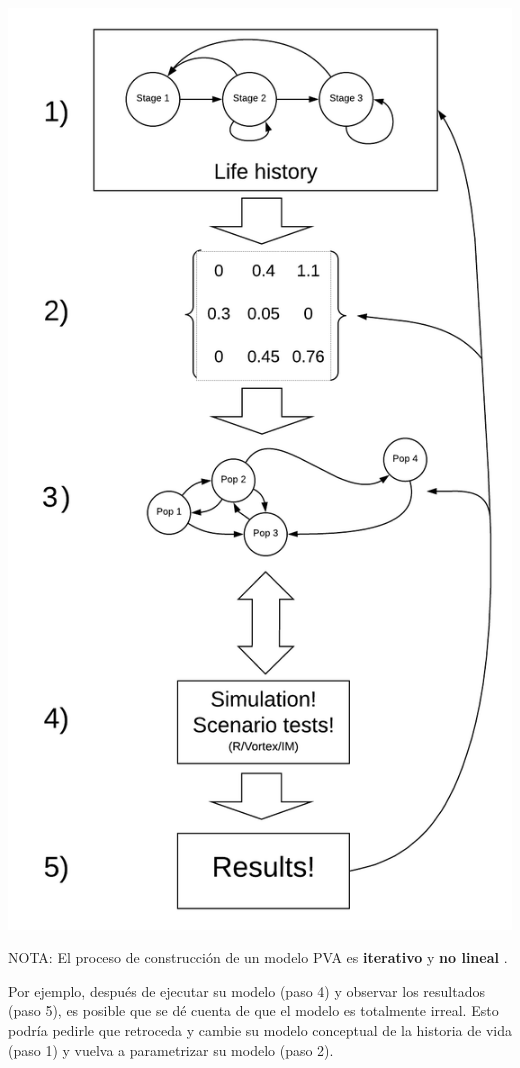\documentclass[
]{article}
\begin{document}
\includegraphics{figures/PVAschematic1.png}

NOTA: El proceso de construcción de un modelo PVA es \textbf{iterativo }
y \textbf{no lineal }.

Por ejemplo, después de ejecutar su modelo (paso 4) y observar los
resultados (paso 5), es posible que se dé cuenta de que el modelo es
totalmente irreal. Esto podría pedirle que retroceda y cambie su modelo
conceptual de la historia de vida (paso 1) y vuelva a parametrizar su
modelo (paso 2).
\end{document}
